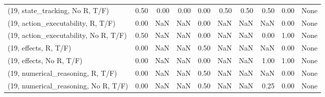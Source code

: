\begin{table*}[h!]
\begin{adjustbox}{width=2\columnwidth,center}
\begin{tabular}{lrrr|rrr|rrr}
(19, state\_tracking, No R, T/F)       &                      0.50 &                  0.00 &                      0.00 &                          0.00 &                      0.50 &                          0.50 &                                   0.50 &                               0.00 &                                  None \\
(19, action\_executability, R, T/F)    &                      0.00 &                   NaN &                       NaN &                          0.00 &                       NaN &                           NaN &                                    NaN &                               0.00 &                                  None \\
(19, action\_executability, No R, T/F) &                      0.50 &                   NaN &                       NaN &                          0.00 &                       NaN &                           NaN &                                   0.00 &                               1.00 &                                  None \\
(19, effects, R, T/F)                 &                      0.00 &                   NaN &                       NaN &                          0.50 &                       NaN &                           NaN &                                    NaN &                               0.00 &                                  None \\
(19, effects, No R, T/F)              &                      0.00 &                   NaN &                       NaN &                          0.00 &                       NaN &                           NaN &                                   1.00 &                               1.00 &                                  None \\
(19, numerical\_reasoning, R, T/F)     &                      0.00 &                   NaN &                       NaN &                          0.50 &                       NaN &                           NaN &                                    NaN &                               0.00 &                                  None \\
(19, numerical\_reasoning, No R, T/F)  &                      0.00 &                   NaN &                       NaN &                          0.50 &                       NaN &                           NaN &                                   0.25 &                               0.00 &                                  None \\

\end{tabular}
\end{adjustbox}
\end{table*}

